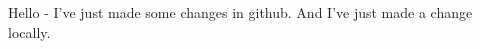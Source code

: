 \documentclass{article}
\begin{document}
Hello - I've just made some changes in github. And I've just made a change locally.
\end{document}

